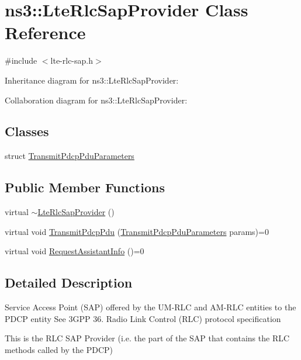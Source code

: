 \hypertarget{classns3_1_1LteRlcSapProvider}{}\section{ns3\+:\+:Lte\+Rlc\+Sap\+Provider Class Reference}
\label{classns3_1_1LteRlcSapProvider}


{\ttfamily \#include $<$lte-\/rlc-\/sap.\+h$>$}



Inheritance diagram for ns3\+:\+:Lte\+Rlc\+Sap\+Provider\+:


Collaboration diagram for ns3\+:\+:Lte\+Rlc\+Sap\+Provider\+:
\subsection*{Classes}
\begin{DoxyCompactItemize}
\item 
struct \hyperlink{structns3_1_1LteRlcSapProvider_1_1TransmitPdcpPduParameters}{Transmit\+Pdcp\+Pdu\+Parameters}
\end{DoxyCompactItemize}
\subsection*{Public Member Functions}
\begin{DoxyCompactItemize}
\item 
virtual \hyperlink{classns3_1_1LteRlcSapProvider_aa50ba1128b9ee61c7a2e08b42184c527}{$\sim$\+Lte\+Rlc\+Sap\+Provider} ()
\item 
virtual void \hyperlink{classns3_1_1LteRlcSapProvider_ad2bdc756a034aa21c163da2deb705a50}{Transmit\+Pdcp\+Pdu} (\hyperlink{structns3_1_1LteRlcSapProvider_1_1TransmitPdcpPduParameters}{Transmit\+Pdcp\+Pdu\+Parameters} params)=0
\item 
virtual void \hyperlink{classns3_1_1LteRlcSapProvider_a4252d4375e3644ba12221cea20028907}{Request\+Assistant\+Info} ()=0
\end{DoxyCompactItemize}


\subsection{Detailed Description}
Service Access Point (S\+AP) offered by the U\+M-\/\+R\+LC and A\+M-\/\+R\+LC entities to the P\+D\+CP entity See 3\+G\+PP 36. Radio Link Control (R\+LC) protocol specification

This is the R\+LC S\+AP Provider (i.\+e. the part of the S\+AP that contains the R\+LC methods called by the P\+D\+CP) 

